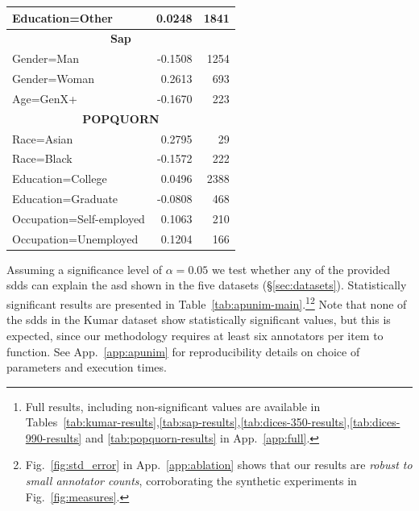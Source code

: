 \documentclass[manuscript,screen,review,anonymous]{acmart}
\theoremstyle{acmplain}
\theoremstyle{researchquestionstyle}
\begin{document}
\begin{table}[t]
\begin{minipage}[t]{0.485\linewidth}
\begin{tabularx}{\linewidth}{X r r}
			Education=Other & 0.0248 & 1841 \\
			\midrule
			\multicolumn{3}{c}{\textbf{Sap}} \\
			\midrule
			\rowcolor{gray!15}
			Gender=Man & -0.1508 & 1254 \\
			\rowcolor{gray!15}
			Gender=Woman & 0.2613 & 693 \\
			Age=GenX+ & -0.1670 & 223 \\
			\midrule
			\multicolumn{3}{c}{\textbf{POPQUORN}} \\
			\midrule
			\rowcolor{gray!15}
			Race=Asian & 0.2795 & 29 \\
			\rowcolor{gray!15}
			Race=Black & -0.1572 & 222 \\
			Education=College & 0.0496 & 2388 \\
			Education=Graduate & -0.0808 & 468 \\
			Occupation=Self-employed & 0.1063 & 210 \\
			Occupation=Unemployed & 0.1204 & 166 \\
			\bottomrule
		\end{tabularx}
	\end{minipage}
\end{table}

Assuming a significance level of $\alpha=0.05$ we test whether any of the provided \acp{sdd} can explain the \ac{asd} shown in the five datasets (\S\ref{sec:datasets}). Statistically significant results are presented in Table~\ref{tab:apunim-main}.\footnote{Full results, including non-significant values are available in Tables~\ref{tab:kumar-results},\ref{tab:sap-results},\ref{tab:dices-350-results},\ref{tab:dices-990-results} and \ref{tab:popquorn-results} in App.~\ref{app:full}.}\footnote{Fig.~\ref{fig:std_error} in App.~\ref{app:ablation} shows that our results are \emph{robust to small annotator counts}, corroborating the synthetic experiments in Fig.~\ref{fig:measures}.} Note that none of the \acp{sdd} in the Kumar dataset show statistically significant values, but this is expected, since our methodology requires at least six annotators per item to function. See App.~\ref{app:apunim} for reproducibility details on choice of parameters and execution times.
\end{document}
